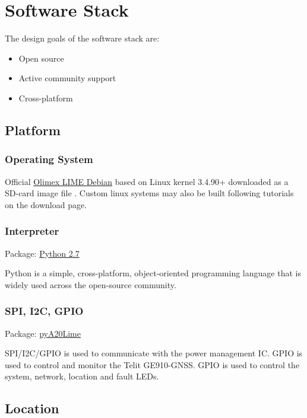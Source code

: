 \section{Software Stack}

The design goals of the software stack are:
\begin{itemize}
\item Open source
\item Active community support
\item Cross-platform
\end{itemize}

\subsection{Platform}
\subsubsection{Operating System}
Official \href{https://www.olimex.com/wiki/A20-OLinuXino-LIME#How_to_generate_boot-able_SD-card_Debian_Linux_image_for_A20-OLinuXino-LIME.3F}{Olimex LIME Debian} based on Linux kernel 3.4.90+ downloaded as a SD-card image file . Custom linux systems may also be built following tutorials on the download page.

\subsubsection{Interpreter}

Package:	\href{https://www.python.org/downloads/release/python-279/}{Python 2.7}

Python is a simple, cross-platform, object-oriented programming language that is widely used across the open-source community.

\subsubsection{SPI, I2C, GPIO}
	
Package:	\href{https://pypi.python.org/pypi/pyA20Lime}{pyA20Lime}

SPI/I2C/GPIO is used to communicate with the power management IC. GPIO is used to control and monitor the Telit GE910-GNSS. GPIO is used to control the system, network, location and fault LEDs.
    
\subsection{Location}

